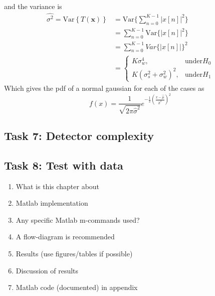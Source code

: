 and the variance is
\begin{align}
    \hat{\sigma^2} = \mathrm{Var}\left\{T(\mathbf{x})\right\} & = \mathrm{Var}\{\sum_{n=0}^{K-1}|x[n]|^2\}\nonumber\\
    & = \sum_{n=0}^{K-1}\mathrm{Var}\{|x[n]|^2\}\nonumber\\
    & = \sum_{n=0}^{K-1}Var\{|x[n]|\}^2\nonumber\\
    & = \begin{cases}
    K\sigma_w^4, & \text{under} H_0\\
    K(\sigma_s^2+\sigma_w^2)^2, & \text{under} H_1
    \end{cases}
\end{align}
Which gives the pdf of a normal gaussian for each of the cases as
\begin{equation}
    f(x) = \frac{1}{\sqrt{2\pi\hat{\sigma}^2}}e^{-\frac{1}{2}\left(\frac{x-\hat{\mu}}{\hat{\sigma}^2}\right)^2}
\end{equation}







\subsection{Task 7: Detector complexity}

\subsection{Task 8: Test with data}

\begin{enumerate}[i]
    \item What is this chapter about
    \item Matlab implementation
    \item Any specific Matlab m-commands used?
    \item A flow-diagram is recommended
    \item Results (use figures/tables if possible)
    \item Discussion of results
    \item Matlab code (documented) in appendix
\end{enumerate}





